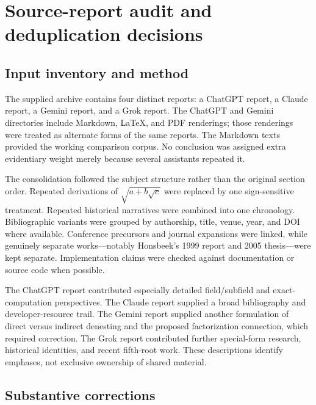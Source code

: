 \documentclass[11pt,a4paper]{article}
\theoremstyle{definition}
\theoremstyle{remark}
\numberwithin{equation}{section}
\begin{document}
\clearpage
\appendix
\section{Source-report audit and deduplication decisions}
\label{app:audit}

\subsection{Input inventory and method}

The supplied archive contains four distinct reports: a ChatGPT report, a Claude report, a Gemini report, and a Grok report. The ChatGPT and Gemini directories include Markdown, \LaTeX{}, and PDF renderings; those renderings were treated as alternate forms of the same reports. The Markdown texts provided the working comparison corpus. No conclusion was assigned extra evidentiary weight merely because several assistants repeated it.

The consolidation followed the subject structure rather than the original section order. Repeated derivations of $\sqrt{a+b\sqrt c}$ were replaced by one sign-sensitive treatment. Repeated historical narratives were combined into one chronology. Bibliographic variants were grouped by authorship, title, venue, year, and DOI where available. Conference precursors and journal expansions were linked, while genuinely separate works---notably Honsbeek's 1999 report and 2005 thesis---were kept separate. Implementation claims were checked against documentation or source code when possible.

The ChatGPT report contributed especially detailed field/subfield and exact-computation perspectives. The Claude report supplied a broad bibliography and developer-resource trail. The Gemini report supplied another formulation of direct versus indirect denesting and the proposed factorization connection, which required correction. The Grok report contributed further special-form research, historical identities, and recent fifth-root work. These descriptions identify emphases, not exclusive ownership of shared material.

\subsection{Substantive corrections}
\end{document}
